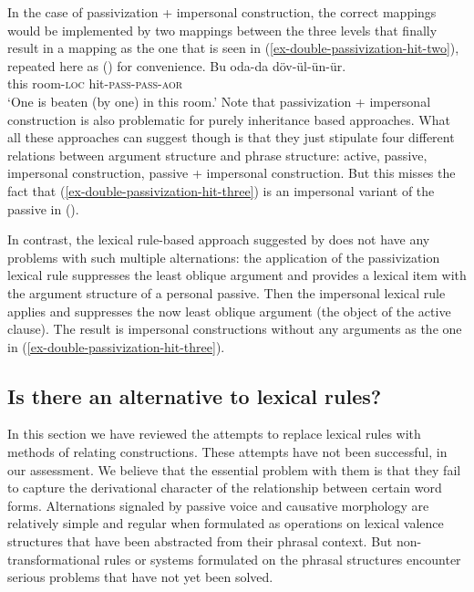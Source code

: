 \begin{exe}
\begin{xlist}[iv.]
\begin{exe}
\begin{xlist}[iv.]
\largerpage
\noindent
In the case of passivization + impersonal construction, the correct mappings would be implemented by two mappings between the three levels
that finally result in a mapping as the one that is seen in (\ref{ex-double-passivization-hit-two}),
repeated here as () for convenience.
\ea
\label{ex-double-passivization-hit-three}
\gll Bu oda-da döv-ül-ün-ür.\\
     this room-\textsc{loc} hit-\textsc{pass}-\textsc{pass}-\textsc{aor}\\
\glt `One is beaten (by one) in this room.'
\z
Note that passivization + impersonal construction is also problematic for purely inheritance based approaches. What
all these approaches can suggest though is that they just stipulate four different relations between
argument structure and phrase structure: active, passive, impersonal construction, passive + impersonal construction. But this misses the fact
that (\ref{ex-double-passivization-hit-three}) is an impersonal variant of the passive in ().

In contrast, the lexical rule-based approach suggested by
\citet{Mueller2003e} does not have any problems with such multiple alternations:
the application of the passivization lexical rule suppresses the least oblique argument and
provides a lexical item with the argument structure of a personal passive. Then the impersonal
lexical rule applies and suppresses the now least oblique argument (the object of the active
clause). The result is impersonal constructions without any arguments as the one in (\ref{ex-double-passivization-hit-three}).




\subsection{Is there an alternative to lexical rules?}
 
In this section we have reviewed the attempts to replace lexical rules with methods of relating
constructions.  These attempts have not been successful, in our assessment.  We believe that the
essential problem with them is that they fail to capture the derivational character of the
relationship between certain word forms.  Alternations signaled by passive voice and causative
morphology are relatively simple and regular when formulated as operations on lexical valence
structures that have been abstracted from their phrasal context.  But non-transformational rules or
systems formulated on the phrasal structures encounter serious problems that have not yet been
solved.


\end{xlist}
\end{exe}
\end{xlist}
\end{exe}
